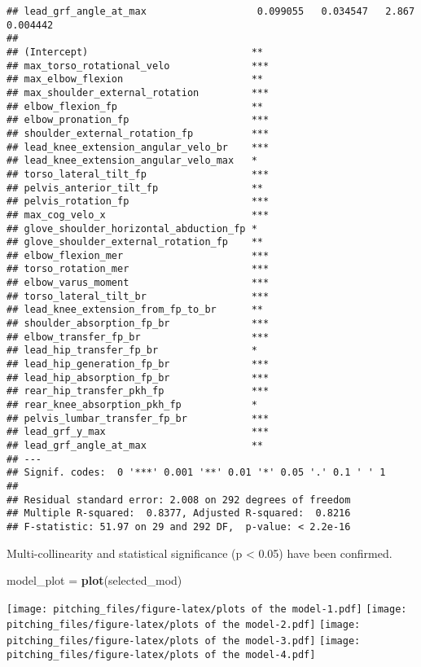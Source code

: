 \documentclass[
]{article}
\newenvironment{Shaded}{\begin{snugshade}}{\end{snugshade}}
\newcommand{\FunctionTok}[1]{\textcolor[rgb]{0.13,0.29,0.53}{\textbf{#1}}}
\newcommand{\NormalTok}[1]{#1}
\newcommand{\OtherTok}[1]{\textcolor[rgb]{0.56,0.35,0.01}{#1}}
\begin{document}
\begin{verbatim}
## lead_grf_angle_at_max                   0.099055   0.034547   2.867 0.004442
##                                           
## (Intercept)                            ** 
## max_torso_rotational_velo              ***
## max_elbow_flexion                      ** 
## max_shoulder_external_rotation         ***
## elbow_flexion_fp                       ** 
## elbow_pronation_fp                     ***
## shoulder_external_rotation_fp          ***
## lead_knee_extension_angular_velo_br    ***
## lead_knee_extension_angular_velo_max   *  
## torso_lateral_tilt_fp                  ***
## pelvis_anterior_tilt_fp                ** 
## pelvis_rotation_fp                     ***
## max_cog_velo_x                         ***
## glove_shoulder_horizontal_abduction_fp *  
## glove_shoulder_external_rotation_fp    ** 
## elbow_flexion_mer                      ***
## torso_rotation_mer                     ***
## elbow_varus_moment                     ***
## torso_lateral_tilt_br                  ***
## lead_knee_extension_from_fp_to_br      ** 
## shoulder_absorption_fp_br              ***
## elbow_transfer_fp_br                   ***
## lead_hip_transfer_fp_br                *  
## lead_hip_generation_fp_br              ***
## lead_hip_absorption_fp_br              ***
## rear_hip_transfer_pkh_fp               ***
## rear_knee_absorption_pkh_fp            *  
## pelvis_lumbar_transfer_fp_br           ***
## lead_grf_y_max                         ***
## lead_grf_angle_at_max                  ** 
## ---
## Signif. codes:  0 '***' 0.001 '**' 0.01 '*' 0.05 '.' 0.1 ' ' 1
## 
## Residual standard error: 2.008 on 292 degrees of freedom
## Multiple R-squared:  0.8377, Adjusted R-squared:  0.8216 
## F-statistic: 51.97 on 29 and 292 DF,  p-value: < 2.2e-16
\end{verbatim}

Multi-collinearity and statistical significance (p \textless{} 0.05)
have been confirmed.

\begin{Shaded}
\begin{Highlighting}[]
\NormalTok{model\_plot }\OtherTok{=} \FunctionTok{plot}\NormalTok{(selected\_mod)}
\end{Highlighting}
\end{Shaded}

\texttt{[image: pitching\_files/figure-latex/plots of the model-1.pdf]}
\texttt{[image: pitching\_files/figure-latex/plots of the model-2.pdf]}
\texttt{[image: pitching\_files/figure-latex/plots of the model-3.pdf]}
\texttt{[image: pitching\_files/figure-latex/plots of the model-4.pdf]}
\end{document}
